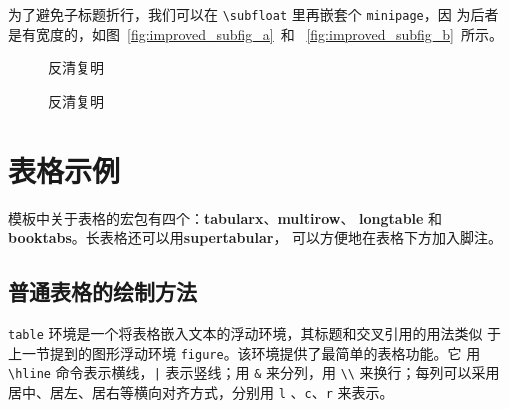 为了避免子标题折行，我们可以在 \verb|\subfloat| 里再嵌套个 \verb|minipage|，因
为后者是有宽度的，如图~\ref{fig:improved_subfig_a}~和
~\ref{fig:improved_subfig_b}~所示。

\begin{code}
\begin{figure}[htbp]
\centering
{}
\hspace{36pt}
\caption{反清复明}
\end{figure}
\end{code}

\begin{figure}[htbp]
\centering
{}
\hspace{36pt}
\caption{反清复明}
\end{figure}

\section{表格示例}
\label{sec:table}

模板中关于表格的宏包有四个：\textbf{tabularx}、\textbf{multirow}、
\textbf{longtable} 和\textbf{booktabs}。长表格还可以用\textbf{supertabular}，
可以方便地在表格下方加入脚注。

\subsection{普通表格的绘制方法}

\texttt{table} 环境是一个将表格嵌入文本的浮动环境，其标题和交叉引用的用法类似
于上一节提到的图形浮动环境 \texttt{figure}。该环境提供了最简单的表格功能。它
用 \verb|\hline| 命令表示横线，\verb&|& 表示竖线；用 \verb|&| 来分列，用
\verb|\\| 来换行；每列可以采用居中、居左、居右等横向对齐方式，分别用 \verb|l|
、\verb|c|、\verb|r| 来表示。

